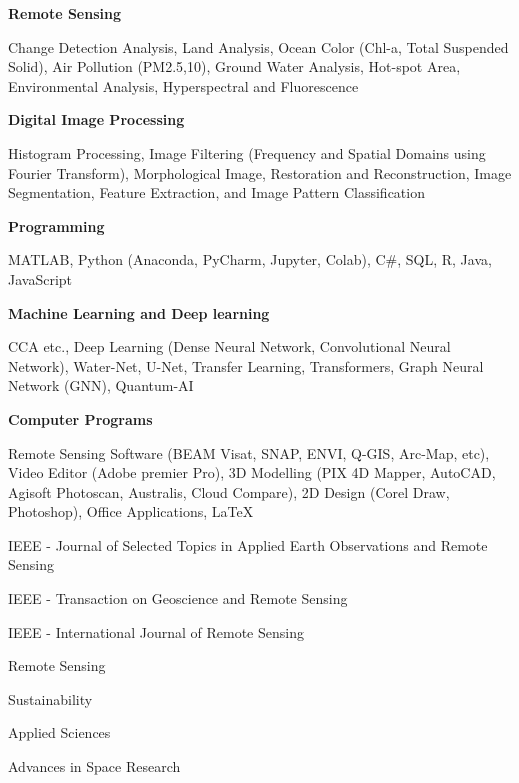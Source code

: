 \documentclass[
  a4paper, 
   maincolor=cvblue,
   sectioncolor=cvblue,
]{fortysecondscv}
\begin{document}
{\color{cvsectioncolor}\textbf{Remote Sensing}} %
\begin{itemize}
	{\small
	\item Change Detection Analysis, Land Analysis, Ocean Color (Chl-a, Total Suspended Solid), Air Pollution (PM2.5,10), Ground Water Analysis, Hot-spot Area, Environmental Analysis, Hyperspectral and Fluorescence
	}
\end{itemize}
{\color{cvsectioncolor}\textbf{Digital Image Processing}} 
\begin{itemize}
	{\small
	\item Histogram Processing, Image Filtering (Frequency and Spatial Domains using Fourier Transform), Morphological Image, Restoration and Reconstruction, Image Segmentation, Feature Extraction, and Image Pattern Classification
	}
\end{itemize}
{\color{cvsectioncolor}\textbf{Programming}}
\begin{itemize}
	{\small
	\item MATLAB, Python (Anaconda, PyCharm, Jupyter, Colab), C\#, SQL, R, Java, JavaScript
	}
\end{itemize}
{\color{cvsectioncolor}\textbf{Machine Learning and Deep learning}}
\begin{itemize}
	{\small
	\item CCA etc., Deep Learning (Dense Neural Network, Convolutional Neural Network), Water-Net, U-Net, Transfer Learning, Transformers, Graph Neural Network (GNN), Quantum-AI
	}
\end{itemize}

\makebacksidebar

{\color{cvsectioncolor}\textbf{Computer Programs}}
\begin{itemize}
	{\small
	\item Remote Sensing Software (BEAM Visat, SNAP, ENVI, Q-GIS, Arc-Map, etc), Video Editor (Adobe premier Pro), 3D Modelling (PIX 4D Mapper, AutoCAD, Agisoft Photoscan, Australis, Cloud Compare), 2D Design (Corel Draw, Photoshop), Office Applications, LaTeX
	}
\end{itemize}


\begin{itemize}
	{
	\item IEEE - Journal of Selected Topics in Applied Earth Observations and Remote Sensing
	\item IEEE - Transaction on Geoscience and Remote Sensing
	\item IEEE - International Journal of Remote Sensing
	\item Remote Sensing
	\item Sustainability
	\item Applied Sciences 
	\item Advances in Space Research
	}
\end{itemize}
\end{document}
